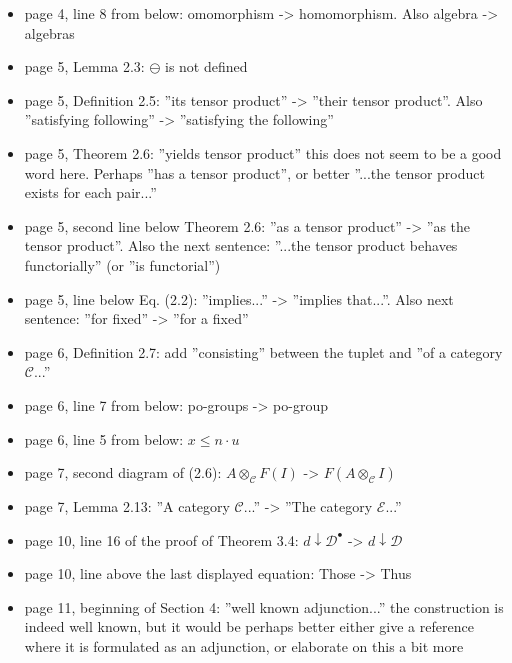 \documentclass[12pt]{article}
\begin{document}
\begin{itemize}
\item page 4, line 8 from below: omomorphism -> homomorphism. Also algebra -> algebras

\item page 5, Lemma 2.3: $\ominus$ is not defined

\item page 5, Definition 2.5: ''its tensor product'' -> ''their tensor product''. Also 
''satisfying following'' -> ''satisfying the following''

\item page 5, Theorem 2.6: ''yields tensor product'' this does not seem to be a good word
here. Perhaps ''has a tensor product'', or better ''...the tensor product exists for each
pair...''

\item page 5, second line below Theorem 2.6: ''as a tensor product'' -> ''as the tensor
product''. Also the next sentence: ''...the tensor product behaves functorially'' (or ''is
functorial'')

\item page 5, line below Eq. (2.2): ''implies...'' -> ''implies that...''. Also next sentence:
''for fixed'' -> ''for a fixed''

\item page 6, Definition 2.7: add ''consisting'' between the tuplet and ''of a category
$\mathcal C$...''

\item page 6, line 7 from below: po-groups -> po-group

\item page 6, line 5 from below: $x\le n\cdot u$

\item page 7, second diagram of (2.6): $A\otimes_{\mathcal C} F(I)$ -> $F(A\otimes_{\mathcal
C} I)$

\item page 7, Lemma 2.13: ''A category $\mathcal C$...'' -> ''The category $\mathcal E$...''

\item page 10, line 16 of the proof of Theorem 3.4: $d\downarrow \mathcal D^\bullet$ ->
$d\downarrow \mathcal D$

\item page 10, line above the last displayed equation: Those -> Thus

\item page 11, beginning of Section 4: ''well known adjunction...'' the construction is
indeed
well known, but it would be perhaps better
either give a reference where it is formulated as an adjunction, or elaborate on this a
bit more


\end{itemize}
\end{document}

